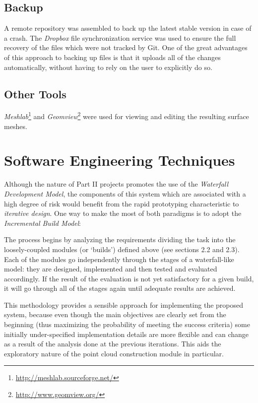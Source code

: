 \documentclass[12pt,a4paper,twoside,openright]{report}
\begin{document}
\subsection{Backup}
A remote repository was assembled to back up the latest stable version in case of a crash. The \emph{Dropbox} file synchronization service was used to ensure the full recovery of the files which were not tracked by Git. One of the great advantages of this approach to backing up files is that it uploads all of the changes automatically, without having to rely on the user to explicitly do so.  
\subsection{Other Tools}
\textit{Meshlab}\footnote{\url{http://meshlab.sourceforge.net/}} and \textit{Geomview}\footnote{\url{http://www.geomview.org/}} were used for  viewing and editing the resulting surface meshes. 

\section{Software Engineering Techniques}
Although the nature of Part II projects promotes the use of the \emph{Waterfall Development Model}, the components of this system which are associated with a high degree of risk would benefit from the rapid prototyping characteristic to \emph{iterative design}. One way to make the most of both paradigms is to adopt the \emph{Incremental Build Model}:\\
\begin{adjustwidth}{0.7cm}{}
The process begins by analyzing the requirements dividing the task into the loosely-coupled modules (or \enquote*{builds}) defined above (see sections 2.2 and 2.3). Each of the modules go independently through the stages of a waterfall-like model: they are designed, implemented and then tested and evaluated accordingly. If the result of the evaluation is not yet satisfactory for a given build, it will go through all of the stages again until adequate results are achieved.\\
\end{adjustwidth} 
This methodology provides a sensible approach for implementing the proposed system, because even though the main objectives are clearly set from the beginning (thus maximizing the probability of meeting the success criteria) some initially under-specified implementation details are more flexible and can change as a result of the analysis done at the previous iterations. This aids the exploratory nature of the point cloud construction module in particular.  
\end{document}
